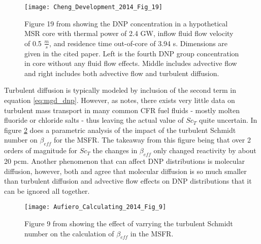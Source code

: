 \documentclass[review]{elsarticle}
\begin{document}
\begin{figure}[h]
   \centering
   \texttt{[image: Cheng\_Development\_2014\_Fig\_19]}
   \caption{Figure 19 from \cite{cheng_development_2014} showing the DNP concentration in a
   hypothetical MSR core with thermal power of 2.4 GW, inflow fluid flow velocity of 0.5
   $\frac{m}{s}$, and residence time out-of-core of 3.94 s. Dimensions are given in the cited
   paper. Left is the fourth
   DNP group concentration in core without any fluid flow effects. Middle
   includes advective flow and right includes both advective flow and
   turbulent diffusion.} 
   \label{fig:cheng_diffusion}
\end{figure}

Turbulent diffusion is typically modeled by inclusion of the second term in
equation \ref{eq:mgd_dnp}. However, as \cite{aufiero_calculating_2014} notes,
there exists very little data on turbulent mass transport in many common
CFR fuel fluids - mostly molten fluoride or chloride salts - thus leaving the
actual value of $Sc_{T}$ quite uncertain. In figure \ref{fig:aufiero_sc}
\cite{aufiero_calculating_2014} does a parametric analysis of the impact of the
turbulent Schmidt number on $\beta_{eff}$ for the MSFR. The takeaway from this
figure being that over 2 orders of magnitude for $Sc_{T}$ the changes in $\beta_{eff}$ only
changed reactivity by about 20 pcm.
Another phenomenon that can affect DNP distributions
is molecular diffusion, however, both \cite{aufiero_calculating_2014} and
\cite{cheng_development_2014} agree that molecular diffusion is so much smaller
than turbulent diffusion and advective flow effects on DNP distributions that it
can be ignored all together.

\begin{figure}[h]
   \centering
   \texttt{[image: Aufiero\_Calculating\_2014\_Fig\_9]}
   \caption{Figure 9 from \cite{aufiero_calculating_2014} showing the effect of varrying
   the turbulent Schmidt number on the calculation of $\beta_{eff}$ in the MSFR.}
   \label{fig:aufiero_sc}
\end{figure}
\end{document}
